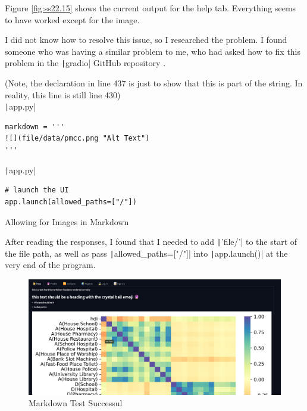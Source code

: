 \documentclass[12pt]{report}
\newcommand{\pil}[1]{\protect\texttt|#1|}
\begin{document}
Figure \ref{fig:ss22.15} shows the current output for the help tab. Everything seems to have worked except for the image.

\begin{center}
\end{center}

I did not know how to resolve this issue, so I researched the problem. I found someone who was having a similar problem to me, who had asked how to fix this problem in the \pil{gradio} GitHub repository \cite{markdownImage}.

\begin{listing}[H]
(Note, the declaration in line 437 is just to show that this is part of the string. In reality, this line is still line 430) \\
\pil{app.py}
\begin{verbatim}
markdown = '''
![](file/data/pmcc.png "Alt Text")
'''
\end{verbatim}
\pil{app.py}
\begin{verbatim}
# launch the UI
app.launch(allowed_paths=["/"])
\end{verbatim}
\caption{Allowing for Images in Markdown}\label{cs:allowImages}
\end{listing}

After reading the responses, I found that I needed to add \pil{'file/'} to the start of the file path, as well as pass \pil{allowed_paths=["/"]} into \pil{app.launch()} at the very end of the program.

\begin{figure}[H]
\centering
\includegraphics[width=14cm]{ss22.16.png}
\caption{Markdown Test Successul}\label{fig:ss22.16}
\end{figure}
\end{document}
